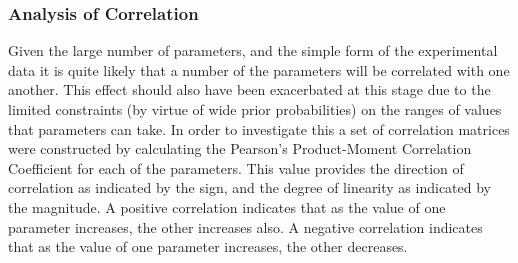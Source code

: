 \subsubsection{Analysis of Correlation}
Given the large number of parameters, and the simple form of the experimental data it is quite likely that a number of the parameters will be correlated with one another. This effect should also have been exacerbated at this stage due to the limited constraints (by virtue of wide prior probabilities) on the ranges of values that parameters can take. In order to investigate this a set of correlation matrices were constructed by calculating the Pearson's Product-Moment Correlation Coefficient for each of the parameters. This value provides the direction of correlation as indicated by the sign, and the degree of linearity as indicated by the magnitude. A positive correlation indicates that as the value of one parameter increases, the other increases also. A negative correlation indicates that as the value of one parameter increases, the other decreases.

